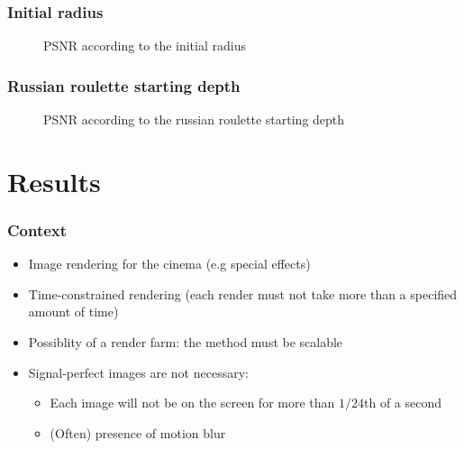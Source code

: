 \documentclass{beamer}
\begin{document}
\begin{frame}
    \frametitle{Initial radius}
    \begin{minipage}{0.5\textwidth}
    \end{minipage}
    \begin{minipage}{\textwidth}
    \begin{figure}
        \centering
        \caption{PSNR according to the initial radius}
    \end{figure}
    \end{minipage}
\end{frame}
\begin{frame}
    \frametitle{Russian roulette starting depth}
    \begin{minipage}{0.5\textwidth}
    \end{minipage}
    \begin{minipage}{\textwidth}
    \begin{figure}
        \centering
        \caption{PSNR according to the russian roulette starting depth}
    \end{figure}
    \end{minipage}
\end{frame}

\section{Results}
\begin{frame}
    \frametitle{Context}
    \begin{itemize}
        \item Image rendering for the cinema (e.g special effects)
        \item Time-constrained rendering (each render must not take more than a specified amount of time)
        \item Possiblity of a render farm: the method must be scalable
            \vfill
        \item Signal-perfect images are not necessary:
            \begin{itemize}
                \item Each image will not be on the screen for more than $1/24$th of a second
                \item (Often) presence of motion blur
            \end{itemize}
    \end{itemize}
\end{frame}
\end{document}
